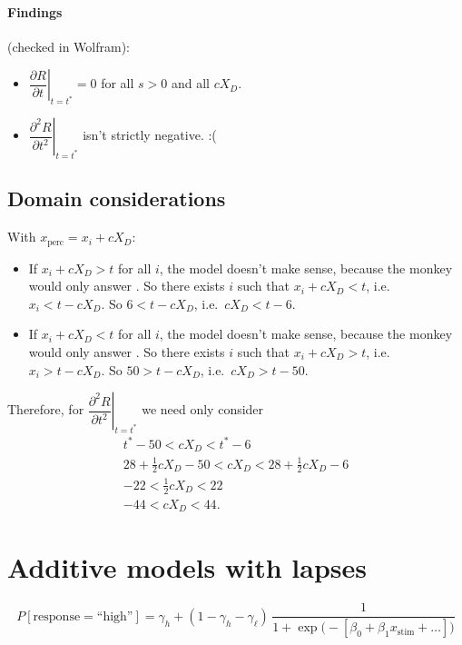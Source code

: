 \documentclass[11pt]{article}
\newcommand{\xs}{x_{\text{stim}}}
\newcommand{\xp}{x_{\text{perc}}}
\newcommand{\high}{\text{``high''}}
\newcommand{\low}{\text{``low''}}
\begin{document}
\paragraph{Findings} (checked in Wolfram):
\begin{itemize}
  \item $\left.\dfrac{\partial R}{\partial t}\right|_{t=t^*} = 0$ for all $s > 0$ and all $cX_D$. \checkmark
  \item $\left.\dfrac{\partial^2 R}{\partial t^2}\right|_{t=t^*}$ isn't strictly negative. :(
\end{itemize}

\subsection*{Domain considerations}

With $\xp = x_i + cX_D$:
\begin{itemize}
  \item If $x_i + cX_D > t$ for all $i$, the model doesn't make sense, because the
  monkey would only answer \high. So there exists $i$ such that
  $x_i + cX_D < t$, i.e.\ $x_i < t - cX_D$. So $6 < t - cX_D$, i.e.\ $cX_D < t-6$.
  \item If $x_i + cX_D < t$ for all $i$, the model doesn't make sense, because the
  monkey would only answer \low. So there exists $i$ such that
  $x_i + cX_D > t$, i.e.\ $x_i > t - cX_D$. So $50 > t - cX_D$, i.e.\ $cX_D > t-50$.
\end{itemize}
Therefore, for $\left.\dfrac{\partial^2 R}{\partial t^2}\right|_{t=t^*}$ we need only consider
\begin{gather*}
  t^* - 50 < cX_D < t^* - 6\\
  28 + \tfrac12 cX_D - 50 < cX_D < 28 + \tfrac12 cX_D - 6\\
  -22 < \tfrac12 cX_D < 22\\
  -44 < cX_D < 44 .
\end{gather*}

\section{Additive models with lapses}

\[
  P[\text{response} = \high] = \gamma_h + (1-\gamma_h-\gamma_\ell)\,
  \frac{1}{1+\exp\bigl(-[\beta_0+\beta_1\xs+\dots]\bigr)}
\]
\end{document}
